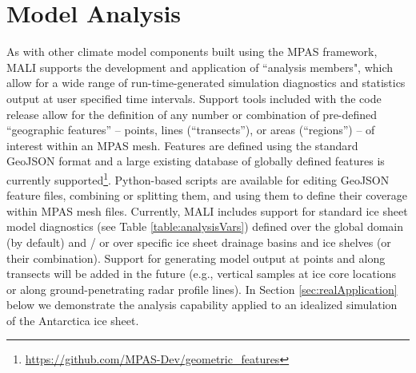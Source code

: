 \chapter{Model Analysis}
\label{chap:landice-analysis}

As with other climate model components built using the MPAS framework, MALI supports the development and application of ``analysis members", which allow for a wide range of run-time-generated simulation diagnostics and statistics output at user specified time intervals. Support tools included with the code release allow for the definition of any number or combination of pre-defined ``geographic features'' -- points, lines (``transects''), or areas (``regions'') -- of interest within an MPAS mesh. Features are defined using the standard GeoJSON format \citep{geojson} and a large existing database of globally defined features is currently supported\footnote{\url{https://github.com/MPAS-Dev/geometric_features}}. Python-based scripts are available for editing GeoJSON feature files, combining or splitting them, and using them to define their coverage within MPAS mesh files. Currently, MALI includes support for standard ice sheet model diagnostics (see Table \ref{table:analysisVars}) defined over the global domain (by default) and / or over specific ice sheet drainage basins and ice shelves (or their combination). Support for generating model output at points and along transects will be  added in the future (e.g., vertical samples at ice core locations or along ground-penetrating radar profile lines). In Section \ref{sec:realApplication} below we demonstrate the analysis capability applied to an idealized simulation of the Antarctica ice sheet.


